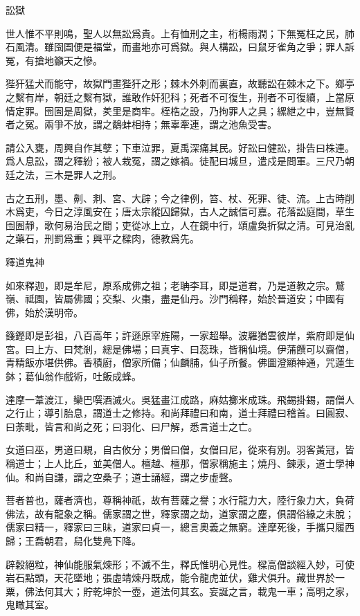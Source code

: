 \documentclass[12pt,a4paper]{ctexbook}
\begin{document}
訟獄\par
世人惟不平則鳴，聖人以無訟爲貴。上有恤刑之主，桁楊雨潤；下無冤枉之民，肺石風清。雖囹圄便是福堂，而畫地亦可爲獄。與人構訟，曰鼠牙雀角之爭；罪人訴冤，有搶地籲天之慘。\par
狴犴猛犬而能守，故獄門畫狴犴之形；棘木外刺而裏直，故聽訟在棘木之下。鄉亭之繫有岸，朝廷之繫有獄，誰敢作奸犯科；死者不可復生，刑者不可復續，上當原情定罪。囹圄是周獄，羑里是商牢。桎梏之設，乃拘罪人之具；縲紲之中，豈無賢者之冤。兩爭不放，謂之鷸蚌相持；無辜牽連，謂之池魚受害。\par
請公入甕，周興自作其孽；下車泣罪，夏禹深痛其民。好訟曰健訟，掛告曰株連。爲人息訟，謂之釋紛；被人栽冤，謂之嫁禍。徒配曰城旦，遣戍是問軍。三尺乃朝廷之法，三木是罪人之刑。\par
古之五刑，墨、劓、剕、宮、大辟；今之律例，笞、杖、死罪、徒、流。上古時削木爲吏，今日之淳風安在；唐太宗縱囚歸獄，古人之誠信可嘉。花落訟庭間，草生囹圄靜，歌何易治民之間；吏從冰上立，人在鏡中行，頌盧奐折獄之清。可見治亂之藥石，刑罰爲重；興平之樑肉，德教爲先。\par
釋道鬼神\par
如來釋迦，即是牟尼，原系成佛之祖；老聃李耳，即是道君，乃是道教之宗。鷲嶺、祗園，皆屬佛國；交梨、火棗，盡是仙丹。沙門稱釋，始於晉道安；中國有佛，始於漢明帝。\par
籛鏗即是彭祖，八百高年；許遜原宰旌陽，一家超舉。波羅猶雲彼岸，紫府即是仙宮。曰上方、曰梵剎，總是佛場；曰真宇、曰蕊珠，皆稱仙境。伊蒲饌可以齋僧，青精飯亦堪供佛。香積廚，僧家所備；仙麟脯，仙子所餐。佛圖澄顯神通，咒蓮生鉢；葛仙翁作戲術，吐飯成蜂。\par
達摩一葦渡江，欒巴噀酒滅火。吳猛畫江成路，麻姑擲米成珠。飛錫掛錫，謂僧人之行止；導引胎息，謂道士之修持。和尚拜禮曰和南，道士拜禮曰稽首。曰圓寂、曰荼毗，皆言和尚之死；曰羽化、曰尸解，悉言道士之亡。\par
女道曰巫，男道曰覡，自古攸分；男僧曰僧，女僧曰尼，從來有別。羽客黃冠，皆稱道士；上人比丘，並美僧人。檀越、檀那，僧家稱施主；燒丹、鍊汞，道士學神仙。和尚自謙，謂之空桑子；道士誦經，謂之步虛聲。\par
菩者普也，薩者濟也，尊稱神祇，故有菩薩之譽；水行龍力大，陸行象力大，負荷佛法，故有龍象之稱。儒家謂之世，釋家謂之劫，道家謂之塵，俱謂俗緣之未脫；儒家曰精一，釋家曰三昧，道家曰貞一，總言奧義之無窮。達摩死後，手攜只履西歸；王喬朝君，舄化雙鳧下降。\par
辟穀絕粒，神仙能服氣煉形；不滅不生，釋氏惟明心見性。樑高僧談經入妙，可使岩石點頭，天花墜地；張虛靖煉丹既成，能令龍虎並伏，雞犬俱升。藏世界於一粟，佛法何其大；貯乾坤於一壺，道法何其玄。妄誕之言，載鬼一車；高明之家，鬼瞰其室。\par
\end{document}
